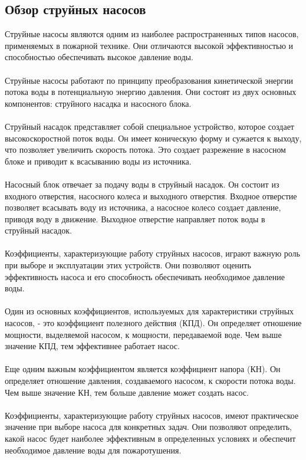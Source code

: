 \documentclass{article}
\begin{document}
\subsection{Обзор струйных насосов}
Струйные насосы являются одним из наиболее распространенных типов насосов, применяемых в пожарной технике. Они отличаются высокой эффективностью и способностью обеспечивать высокое давление воды.\\
~\\
Струйные насосы работают по принципу преобразования кинетической энергии потока воды в потенциальную энергию давления. Они состоят из двух основных компонентов: струйного насадка и насосного блока.\\
~\\
Струйный насадок представляет собой специальное устройство, которое создает высокоскоростной поток воды. Он имеет коническую форму и сужается к выходу, что позволяет увеличить скорость потока. Это создает разрежение в насосном блоке и приводит к всасыванию воды из источника.\\
~\\
Насосный блок отвечает за подачу воды в струйный насадок. Он состоит из входного отверстия, насосного колеса и выходного отверстия. Входное отверстие позволяет всасывать воду из источника, а насосное колесо создает давление, приводя воду в движение. Выходное отверстие направляет поток воды в струйный насадок.\\
~\\
Коэффициенты, характеризующие работу струйных насосов, играют важную роль при выборе и эксплуатации этих устройств. Они позволяют оценить эффективность насоса и его способность обеспечивать необходимое давление воды.\\
~\\
Один из основных коэффициентов, используемых для характеристики струйных насосов, - это коэффициент полезного действия (КПД). Он определяет отношение мощности, выделяемой насосом, к мощности, передаваемой воде. Чем выше значение КПД, тем эффективнее работает насос.\\
~\\
Еще одним важным коэффициентом является коэффициент напора (КН). Он определяет отношение давления, создаваемого насосом, к скорости потока воды. Чем выше значение КН, тем больше давление может создать насос.\\
~\\
Коэффициенты, характеризующие работу струйных насосов, имеют практическое значение при выборе насоса для конкретных задач. Они позволяют определить, какой насос будет наиболее эффективным в определенных условиях и обеспечит необходимое давление воды для пожаротушения.
\end{document}
